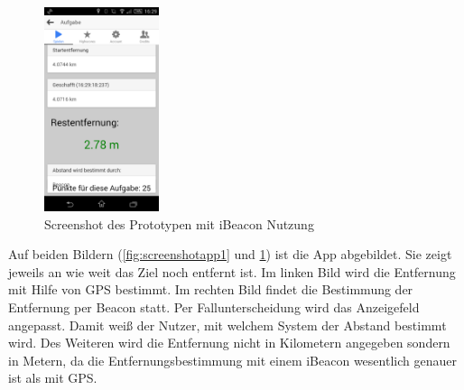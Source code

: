 \begin{figure}
\centering
\includegraphics[width=0.3\textwidth]{ref/images/screenshot2.png}
\caption[Screenshot des Prototypen mit iBeacon Nutzung]{Screenshot des Prototypen mit iBeacon Nutzung}
\label{fig:screenshotapp2}
\end{figure} 
Auf beiden Bildern (\ref{fig:screenshotapp1} und \ref{fig:screenshotapp2}) ist die App abgebildet. Sie zeigt jeweils an wie weit das Ziel noch entfernt ist. Im linken Bild wird die Entfernung mit Hilfe von GPS bestimmt. Im rechten Bild findet die Bestimmung der Entfernung per Beacon statt.
Per Fallunterscheidung wird das Anzeigefeld angepasst. Damit weiß der Nutzer, mit welchem System der Abstand bestimmt wird. Des Weiteren wird die Entfernung nicht in Kilometern angegeben sondern in Metern, da die Entfernungsbestimmung mit einem iBeacon wesentlich genauer ist als mit GPS.

